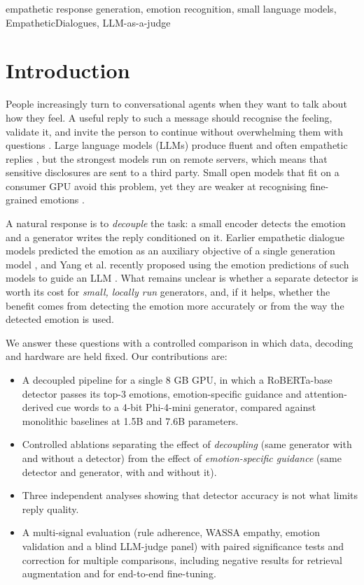 \documentclass[conference,a4paper]{IEEEtran}
\begin{document}
\begin{IEEEkeywords}
empathetic response generation, emotion recognition, small language models, EmpatheticDialogues, LLM-as-a-judge

\end{IEEEkeywords}


\section{Introduction}
People increasingly turn to conversational agents when they want to talk about how they feel. A useful reply to such a message should recognise the feeling, validate it, and invite the person to continue without overwhelming them with questions \cite{b1}. Large language models (LLMs) produce fluent and often empathetic replies \cite{b2,b3}, but the strongest models run on remote servers, which means that sensitive disclosures are sent to a third party. Small open models that fit on a consumer GPU avoid this problem, yet they are weaker at recognising fine-grained emotions \cite{b4}.

A natural response is to \emph{decouple} the task: a small encoder detects the emotion and a generator writes the reply conditioned on it. Earlier empathetic dialogue models predicted the emotion as an auxiliary objective of a single generation model \cite{b5,b6,b7}, and Yang et al. recently proposed using the emotion predictions of such models to guide an LLM \cite{b8}. What remains unclear is whether a separate detector is worth its cost for \emph{small, locally run} generators, and, if it helps, whether the benefit comes from detecting the emotion more accurately or from the way the detected emotion is used.

We answer these questions with a controlled comparison in which data, decoding and hardware are held fixed. Our contributions are:

\begin{itemize}
\item A decoupled pipeline for a single 8 GB GPU, in which a RoBERTa-base detector passes its top-3 emotions, emotion-specific guidance and attention-derived cue words to a 4-bit Phi-4-mini generator, compared against monolithic baselines at 1.5B and 7.6B parameters.
\item Controlled ablations separating the effect of \emph{decoupling} (same generator with and without a detector) from the effect of \emph{emotion-specific guidance} (same detector and generator, with and without it).
\item Three independent analyses showing that detector accuracy is not what limits reply quality.
\item A multi-signal evaluation (rule adherence, WASSA empathy, emotion validation and a blind LLM-judge panel) with paired significance tests and correction for multiple comparisons, including negative results for retrieval augmentation and for end-to-end fine-tuning.
\end{itemize}
\end{document}
